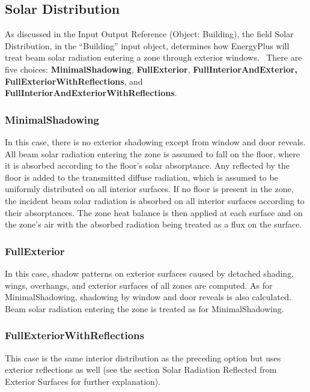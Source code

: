 \subsection{Solar Distribution}\label{solar-distribution}

As discussed in the Input Output Reference (Object: Building), the field Solar Distribution, in the ``Building'' input object, determines how EnergyPlus will treat beam solar radiation entering a zone through exterior windows.~ There are five choices: \textbf{MinimalShadowing}, \textbf{FullExterior}, \textbf{FullInteriorAndExterior, FullExteriorWithReflections}, and \textbf{FullInteriorAndExteriorWithReflections}.

\subsubsection{MinimalShadowing}\label{minimalshadowing}

In this case, there is no exterior shadowing except from window and door reveals. All beam solar radiation entering the zone is assumed to fall on the floor, where it is absorbed according to the floor's solar absorptance. Any reflected by the floor is added to the transmitted diffuse radiation, which is assumed to be uniformly distributed on all interior surfaces. If no floor is present in the zone, the incident beam solar radiation is absorbed on all interior surfaces according to their absorptances. The zone heat balance is then applied at each surface and on the zone's air with the absorbed radiation being treated as a flux on the surface.

\subsubsection{FullExterior}\label{fullexterior}

In this case, shadow patterns on exterior surfaces caused by detached shading, wings, overhangs, and exterior surfaces of all zones are computed. As for MinimalShadowing, shadowing by window and door reveals is also calculated. Beam solar radiation entering the zone is treated as for MinimalShadowing.

\subsubsection{FullExteriorWithReflections}\label{fullexteriorwithreflections}

This case is the same interior distribution as the preceding option but uses exterior reflections as well (see the section Solar Radiation Reflected from Exterior Surfaces for further explanation).

